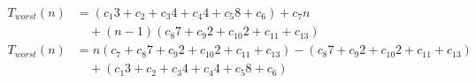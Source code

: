 \begin{subequations}
\label{eq:analyse-getvertex-distance}
\begin{align}
\label{eq:analyse-getvertex-distance-1}
T_{worst}(n)& =
(c_{1}3 + c_{2} + c_{3}4 + c_{4}4 + c_{5}8 + c_{6})
+ c_{7}n
\\
& \quad
+ (n-1) (c_{8}7 + c_{9}2 + c_{10}2 + c_{11}+ c_{13})
\nonumber \\
\label{eq:analyse-getvertex-distance-2}
T_{worst}(n)& =
n(c_{7} + c_{8}7 + c_{9}2 + c_{10}2 + c_{11}+ c_{13})
- (c_{8}7 + c_{9}2 + c_{10}2 + c_{11}+ c_{13})
\\
& \quad
+ (c_{1}3 + c_{2} + c_{3}4 + c_{4}4 + c_{5}8 + c_{6})
\nonumber
\end{align}
\end{subequations}
